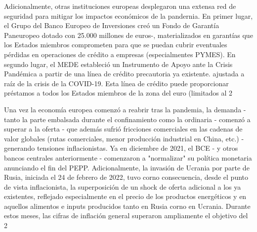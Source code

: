 \documentclass[10pt,a4paper]{article}
\begin{document}
{Adicionalmente, otras instituciones europeas desplegaron una extensa red de seguridad para mitigar los impactos económicos de la pandernia. En primer lugar, el Grupo del Banco Europeo de Inversiones creó un Fondo de Garantía Paneuropeo dotado con 25.000 millones de euros-, materializados en garantías que los Estados miembros comprometen para que se puedan cubrir eventuales pérdidas en operaciones de crédito a empresas (especialmentes PYMES). En segundo lugar, el MEDE estableció un Instrumento de Apoyo ante la Crisis Pandémica a partir de una línea de crédito precautoria ya existente. ajustada a raíz de la crisis de la COVID-19. Esta línea de crédito puede proporcionar préstamos a todos los Estados miembros de la zona del euro (limitados al 2 %

Una vez la economía europea comenzó a reabrir tras la pandemia, la demanda - tanto la parte embalsada durante el confinamiento como la ordinaria - comenzó a superar a la oferta - que además sufrió fricciones comerciales en las cadenas de valor globales (rutas comerciales, menor producción industrial en China, etc.) - generando tensiones inflacionistas. Ya en diciembre de 2021, el BCE - y otros bancos centrales anteriormente - comenzaron a "normalizar" su política monetaria anunciando el fin del PEPP. Adicionalmente, la invasión de Ucrania por parte de Rusia, iniciada el 24 de febrero de 2022, tuvo corno consecuencia, desde el punto de vista inflacionista, la superposición de un shock de oferta adicional a los ya existentes, reflejado especialmente en el precio de los productos energéticos y en aquellos alimentos e inputs producidos tanto en Rusia corno en Ucrania. Durante estos meses, las cifras de inflación general superaron ampliamente el objetivo del 2%

}
\end{document}
